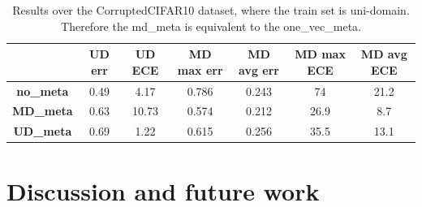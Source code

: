 \documentclass[12pt,a4paper]{article}
\begin{document}
		\begin{table}
			\centering
			\begin{tabular}{ccccccc}
				\hline
				& \textbf{UD err} & \textbf{UD ECE} & \textbf{MD max err} & \textbf{MD avg err} & \textbf{MD max ECE} & \textbf{MD avg ECE} \\
				\hline
				\textbf{no\_meta} & 0.49 & 4.17 & 0.786 & 0.243 & 74 & 21.2 \\
				\textbf{MD\_meta} & 0.63 & 10.73 & 0.574 & 0.212 & 26.9 & 8.7 \\
				\textbf{UD\_meta} & 0.69 & 1.22 & 0.615 & 0.256 & 35.5 & 13.1 \\\hline
			\end{tabular}
			\caption{Results over the CorruptedCIFAR10 dataset, where the train set is uni-domain. Therefore the md\_meta is equivalent to the one\_vec\_meta.}\label{tab:UD_train}
		\end{table}
	
\section{Discussion and future work}
\label{sec:Discussion}
\end{document}

